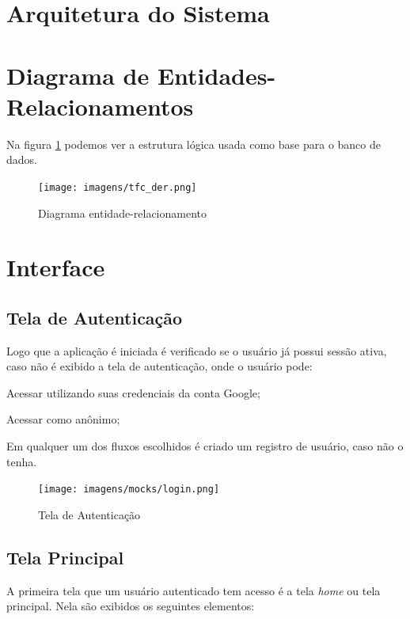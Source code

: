 \section{Arquitetura do Sistema} \label{sec:modelagem:arquitetura}
\section{Diagrama de Entidades-Relacionamentos} \label{sec:modelagem:der}

Na figura \ref{fig:uml_der} podemos ver a estrutura lógica usada como base para o banco de dados.

\begin{figure}[H]
  \caption{\label{fig:uml_der}Diagrama entidade-relacionamento}
  \centering
  \texttt{[image: imagens/tfc\_der.png]}
\end{figure}

\section{Interface} \label{sec:modelagem:interface}

\subsection{Tela de Autenticação}
Logo que a aplicação é iniciada é verificado se o usuário já possui sessão ativa, caso não é exibido a tela de autenticação, onde o usuário pode:

\begin{lista}
  \item Acessar utilizando suas credenciais da conta Google;
  \item Acessar como anônimo;
\end{lista}

Em qualquer um dos fluxos escolhidos é criado um registro de usuário, caso não o tenha.

\begin{figure}[H]
  \caption{\label{fig:mock_login}Tela de Autenticação}
  \centering
  \texttt{[image: imagens/mocks/login.png]}
\end{figure}

\subsection{Tela Principal}
A primeira tela que um usuário autenticado tem acesso é a tela \textit{home} ou tela principal. Nela são exibidos os seguintes elementos:

